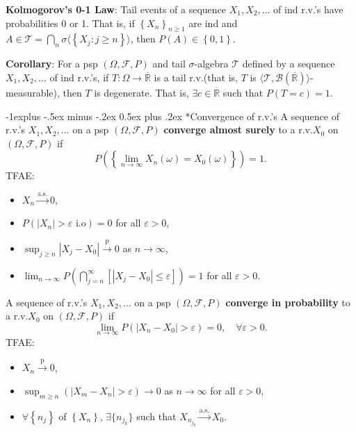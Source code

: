 \documentclass[paper=letter,fontsize=3mm]{scrartcl}
\makeatletter
\newcommand{\convprob}{\stackrel{\text{p}}{\longrightarrow}}
\newcommand{\convas}{\stackrel{\text{a.s.}}{\longrightarrow}}
\newcommand{\Borel}{\mathcal{B}}
\newcommand{\eps}{\varepsilon}
\newcommand{\R}{\mathbb{R}}
\newcommand\abs[1]{\left| #1 \right|}
\newcommand\set[1]{\left\{ #1 \right\}}
\renewcommand{\subsection}{\@startsection{subsection}{2}{0mm}%
                                {-1explus -.5ex minus -.2ex}%
                                {0.5ex plus .2ex}%
                                {\normalfont\normalsize\bfseries}}
\makeatother
\begin{document}
\begin{multicols*}{3}
\textbf{Kolmogorov's 0-1 Law}: Tail events of a sequence $X_1, X_2, \dots$ of ind r.v.\@'s have probabilities 0 or 1. That is, if $\set{X_n}_{n\ge1}$ are ind and $A \in \mathcal{T} = \bigcap_{n} \sigma \langle \set{X_j: j \ge n}\rangle$, then $P(A) \in \set{0,1}$. \\\medskip

\textbf{Corollary}: For a psp $(\Omega, \mathcal{F}, P)$ and tail $\sigma$-algebra $\mathcal{T}$ defined by a sequence $X_1, X_2, \dots$ of ind r.v.\@'s, if $T: \Omega \to \overline{\R}$ is a tail r.v.\@ (that is, $T$ is $\langle \mathcal{T}, \Borel(\overline{\R})\rangle$-measurable), then $T$ is degenerate. That is, $\exists c \in \overline{\R}$ such that $P(T = c) = 1$. \\\medskip

\subsection*{Convergence of r.v.\@'s}
A sequence of r.v.\@'s $X_1, X_2, \dots$ on a psp $(\Omega, \mathcal{F}, P)$ \textbf{converge almost surely} to a r.v.\@ $X_0$ on $(\Omega, \mathcal{F}, P)$ if
$$P\left(\set{\lim_{n\to\infty} X_n(\omega) = X_0(\omega)}\right) = 1.$$
TFAE:
\begin{itemize}
\item $X_n \convas 0$,
\item $P(\abs{X_n} > \eps \text{ i.o}) = 0$ for all $\eps > 0$,
\item $\sup_{j\ge n} \abs{X_j - X_0} \convprob 0$ as $n\to\infty$,
\item $\lim_{n\to\infty} P\left(\bigcap_{j=n}^\infty \left[ \abs{X_j - X_0} \le \eps\right]\right) = 1$ for all $\eps > 0$. 
\end{itemize}

A sequence of r.v.\@'s $X_1, X_2, \dots$ on a psp $(\Omega, \mathcal{F}, P)$ \textbf{converge in probability} to a r.v.\@ $X_0$ on $(\Omega, \mathcal{F}, P)$ if
$$\lim_{n\to\infty} P\left(\abs{X_n - X_0} > \eps\right) = 0, \quad \forall \eps > 0.$$
TFAE:
\begin{itemize}
\item $X_n \convprob 0$,
\item $\sup_{m\ge n}\left( \abs{X_m - X_n} > \eps\right) \to 0$ as $n\to\infty$ for all $\eps > 0$,
\item $\forall \set{n_j}$ of $\set{X_n}$,  $\exists \{n_{j_k}\}$ such that $X_{n_{j_k}} \convas X_0$.
\end{itemize}


\end{multicols*}
\end{document}
